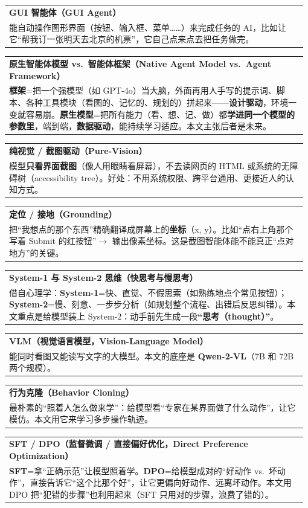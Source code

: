 \documentclass[11pt,UTF8,fontset=fandol]{ctexart}
\makeatletter
\newenvironment{kcard}[1]{%
  \par\smallskip\noindent
  \begin{tabular}{@{}p{0.985\linewidth}@{}}
  \rule{0pt}{1.1em}\textbf{\textcolor{cardline}{#1}}\\[0.2em]
}{%
  \\[0.3em]\end{tabular}\par\smallskip
}
\makeatother
\begin{document}
\begin{kcard}{GUI 智能体（GUI Agent）}
能自动操作图形界面（按钮、输入框、菜单……）来完成任务的 AI，比如让它“帮我订一张明天去北京的机票”，它自己点来点去把任务做完。
\end{kcard}

\begin{kcard}{原生智能体模型 vs.\ 智能体框架（Native Agent Model vs.\ Agent Framework）}
\textbf{框架}=把一个强模型（如 GPT-4o）当大脑，外面再用人手写的提示词、脚本、各种工具模块（看图的、记忆的、规划的）拼起来——\textbf{设计驱动}，环境一变就容易崩。\textbf{原生模型}=把所有能力（看、想、记、做）都\textbf{学进同一个模型的参数里}，端到端，\textbf{数据驱动}，能持续学习适应。本文主张后者是未来。
\end{kcard}

\begin{kcard}{纯视觉 / 截图驱动（Pure-Vision）}
模型\textbf{只看界面截图}（像人用眼睛看屏幕），不去读网页的 HTML 或系统的无障碍树（accessibility tree）。好处：不用系统权限、跨平台通用、更接近人的认知方式。
\end{kcard}

\begin{kcard}{定位 / 接地（Grounding）}
把“我想点的那个东西”精确翻译成屏幕上的\textbf{坐标}（x, y）。比如“点右上角那个写着 Submit 的红按钮”$\rightarrow$ 输出像素坐标。这是截图智能体能不能真正“点对地方”的关键。
\end{kcard}

\begin{kcard}{System-1 与 System-2 思维（快思考与慢思考）}
借自心理学：\textbf{System-1}=快、直觉、不假思索（如熟练地点个常见按钮）；\textbf{System-2}=慢、刻意、一步步分析（如规划整个流程、出错后反思纠错）。本文重点是给模型装上 System-2：动手前先生成一段\textbf{“思考（thought）”}。
\end{kcard}

\begin{kcard}{VLM（视觉语言模型，Vision-Language Model）}
能同时看图又能读写文字的大模型。本文的底座是 \textbf{Qwen-2-VL}（7B 和 72B 两个规模）。
\end{kcard}

\begin{kcard}{行为克隆（Behavior Cloning）}
最朴素的“照着人怎么做来学”：给模型看“专家在某界面做了什么动作”，让它模仿。本文用它来学习多步操作轨迹。
\end{kcard}

\begin{kcard}{SFT / DPO（监督微调 / 直接偏好优化，Direct Preference Optimization）}
\textbf{SFT}=拿“正确示范”让模型照着学。\textbf{DPO}=给模型成对的“好动作 vs.\ 坏动作”，直接告诉它“这个比那个好”，让它更偏向好动作、远离坏动作。本文用 DPO 把“犯错的步骤”也利用起来（SFT 只用对的步骤，浪费了错的）。
\end{kcard}
\end{document}
